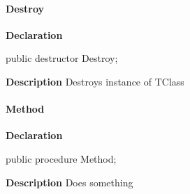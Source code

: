 \documentclass{report}
\newif\ifpdf
\begin{document}
\paragraph*{Destroy}\hspace*{\fill}

\label{ok_parse_impl.TClass-Destroy}
\begin{list}{}{
\setlength{\itemindent}{0cm}
\setlength{\listparindent}{0cm}
\setlength{\leftmargin}{\evensidemargin}
\addtolength{\leftmargin}{\tmplength}
\settowidth{\labelsep}{X}
\addtolength{\leftmargin}{\labelsep}
\setlength{\labelwidth}{\tmplength}
}
\item[\textbf{Declaration}\hfill]
\ifpdf
\begin{flushleft}
\fi
\begin{ttfamily}
public destructor Destroy;\end{ttfamily}

\ifpdf
\end{flushleft}
\fi

\par
\item[\textbf{Description}]
Destroys instance of TClass

\end{list}
\paragraph*{Method}\hspace*{\fill}

\label{ok_parse_impl.TClass-Method}
\begin{list}{}{
\setlength{\itemindent}{0cm}
\setlength{\listparindent}{0cm}
\setlength{\leftmargin}{\evensidemargin}
\addtolength{\leftmargin}{\tmplength}
\settowidth{\labelsep}{X}
\addtolength{\leftmargin}{\labelsep}
\setlength{\labelwidth}{\tmplength}
}
\item[\textbf{Declaration}\hfill]
\ifpdf
\begin{flushleft}
\fi
\begin{ttfamily}
public procedure Method;\end{ttfamily}

\ifpdf
\end{flushleft}
\fi

\par
\item[\textbf{Description}]
Does something

\end{list}
\end{document}

